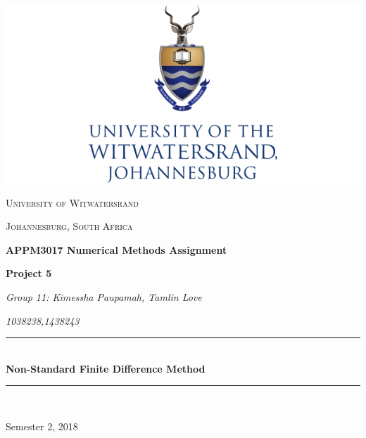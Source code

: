 \documentclass[a4paper]{article}
\author{Group 11: Kimessha Paupamah, }
\date{\today}
\begin{document}
\begin{titlepage}
	\centering
	
\includegraphics[scale=0.5]{index.png}
	\vspace{1cm}
	
\newcommand{\HRule}{\rule{\linewidth}{0.5mm}} 

{\scshape\Large University of Witwatersrand\par}
{\scshape\Large Johannesburg, South Africa\par}
	\vspace{1.5cm}
	{\huge\bfseries APPM3017 Numerical Methods Assignment \par}
	\vspace{1cm}
	{\Large\bfseries Project 5 \par}
	\vspace{1cm}
	{\Large\itshape Group 11: Kimessha Paupamah, Tamlin Love\par}
	\vspace{0.5cm}
	{\Large\itshape 1038238,1438243\par}
	\vfill
	
\HRule \\[0.4cm]
{ \huge \bfseries Non-Standard Finite Difference Method}\\[0.4cm] 
\HRule \\[1.5cm]

	{\large Semester 2, 2018\par}

\end{titlepage}

\begin{abstract}
We investigate the performance of two numerical schemes - the Explicit Finite Difference and Non-Standard Finite Difference - in solving the Fisher Equation $\frac{\partial u}{\partial t} = \frac{\partial^2 u}{\partial x^2} + \rho u(1-u)$. We model the two schemes for varying steps in $x$ and $t$ and compare each to the exact analytical solution, $\frac{1}{(\exp{(\sqrt{\frac{\rho}{6}}x-\frac{5\rho}{6}t)}+1)^2}$. We conclude that FILL THIS IN.
\end{abstract}
\end{document}
